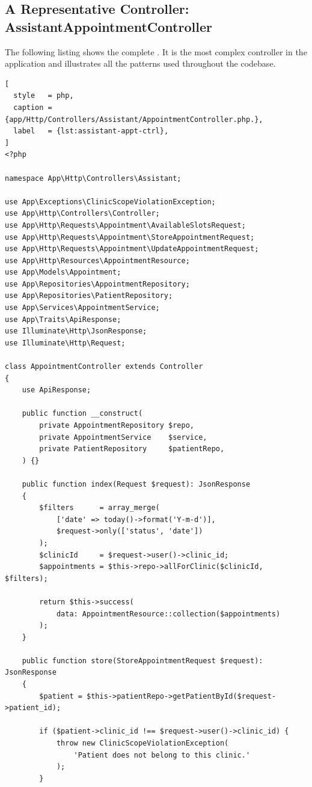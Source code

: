 \subsection{A Representative Controller: AssistantAppointmentController}

The following listing shows the complete
. It is the
most complex controller in the application and illustrates all the
patterns used throughout the codebase.

\begin{lstlisting}[
  style   = php,
  caption = {app/Http/Controllers/Assistant/AppointmentController.php.},
  label   = {lst:assistant-appt-ctrl},
]
<?php

namespace App\Http\Controllers\Assistant;

use App\Exceptions\ClinicScopeViolationException;
use App\Http\Controllers\Controller;
use App\Http\Requests\Appointment\AvailableSlotsRequest;
use App\Http\Requests\Appointment\StoreAppointmentRequest;
use App\Http\Requests\Appointment\UpdateAppointmentRequest;
use App\Http\Resources\AppointmentResource;
use App\Models\Appointment;
use App\Repositories\AppointmentRepository;
use App\Repositories\PatientRepository;
use App\Services\AppointmentService;
use App\Traits\ApiResponse;
use Illuminate\Http\JsonResponse;
use Illuminate\Http\Request;

class AppointmentController extends Controller
{
    use ApiResponse;

    public function __construct(
        private AppointmentRepository $repo,
        private AppointmentService    $service,
        private PatientRepository     $patientRepo,
    ) {}

    public function index(Request $request): JsonResponse
    {
        $filters      = array_merge(
            ['date' => today()->format('Y-m-d')],
            $request->only(['status', 'date'])
        );
        $clinicId     = $request->user()->clinic_id;
        $appointments = $this->repo->allForClinic($clinicId, $filters);

        return $this->success(
            data: AppointmentResource::collection($appointments)
        );
    }

    public function store(StoreAppointmentRequest $request): JsonResponse
    {
        $patient = $this->patientRepo->getPatientById($request->patient_id);

        if ($patient->clinic_id !== $request->user()->clinic_id) {
            throw new ClinicScopeViolationException(
                'Patient does not belong to this clinic.'
            );
        }


\end{lstlisting}
